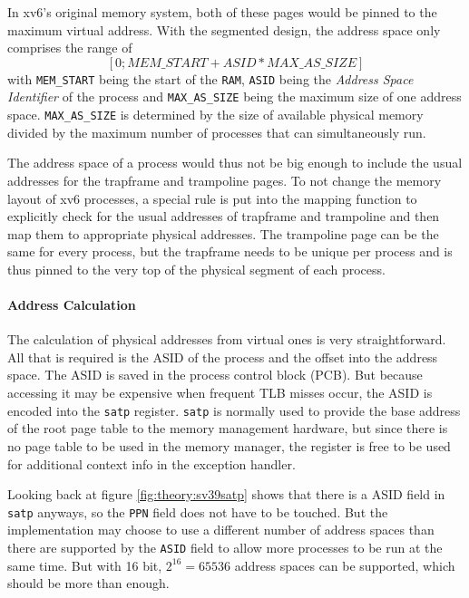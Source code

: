 In xv6's original memory system, both of these pages would be pinned to the maximum virtual address.
With the segmented design, the address space only comprises the range of \[
    [0 ; MEM\_START+ASID*MAX\_AS\_SIZE]
\]
with \texttt{MEM\_START} being the start of the \texttt{RAM}, \texttt{ASID} being the \emph{Address Space Identifier} of the process and \texttt{MAX\_AS\_SIZE} being the maximum size of one address space.
\texttt{MAX\_AS\_SIZE} is determined by the size of available physical memory divided by the maximum
number of processes that can simultaneously run.

The address space of a process would thus not be big enough to include the usual addresses for the
trapframe and trampoline pages.
To not change the memory layout of xv6 processes, a special rule is put into the mapping function
to explicitly check for the usual addresses of trapframe and trampoline and then map them to appropriate physical addresses.
The trampoline page can be the same for every process, but the trapframe needs to be unique per
process and is thus pinned to the very top of the physical segment of each process.





\paragraph{Address Calculation}
The calculation of physical addresses from virtual ones is very straightforward. All that is required is the ASID of the process and the offset into the address space.
The ASID is saved in the process control block (PCB). But because accessing it may be expensive when frequent TLB misses occur, the ASID is encoded into the \texttt{satp} register.
\texttt{satp} is normally used to provide the base address of the root page table to the memory management hardware, but since there is no page table to be used in the memory manager, the register is free to be used for additional context info in the exception handler.

Looking back at figure \ref{fig:theory:sv39satp} shows that there is a ASID field in \texttt{satp} anyways,
so the \texttt{PPN} field does not have to be touched.
But the implementation may choose to use a different number of address spaces than there are supported by the \texttt{ASID} field to allow more processes to be run at the same time.
But with 16 bit, $2^{16} = 65536$ address spaces can be supported, which should be more than enough.

